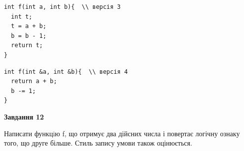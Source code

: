 \documentclass[12pt, ukrainian]{article}
\begin{document}
{\begin {large}
\begin{minipage}[t]{11.0cm}
\vspace{-8mm}\begin{verbatim}
int f(int a, int b){  \\ версія 3
  int t;
  t = a + b;
  b = b - 1;
  return t;
}
\end{verbatim}

\vspace{-8mm}\begin{verbatim}
int f(int &a, int &b){  \\ версія 4
  return a + b;
  b -= 1;
}
\end{verbatim}



\begin{center}
\textbf{Завдання 12}
\end{center}

Написати функцiю f, що отримує два дійсних числа і повертає логічну ознаку того, що друге більше. Стиль запису умови також оцінюється.\par

\end{minipage}

\end {large}}
\newpage
\end{document}
